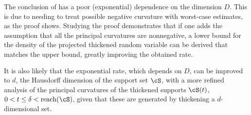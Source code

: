 \documentclass[../../book-main.tex]{subfiles}
\begin{document}
\begin{remark}
    The conclusion of  has
    a poor (exponential) dependence on the dimension $D$. This is due to needing
    to treat possible negative curvature with worst-case estimates, as the proof
    shows. Studying the proof demonstrates that if one adds the assumption that
    all the principal curvatures are nonnegative, a lower bound for the density
    of the projected thickened random variable can be derived that matches the
    upper bound, greatly improving the obtained rate.

    It is also likely that the exponential rate, which depends on $D$, can be
    improved to $d$, the Hausdorff dimension of the support set $\cS$, with
    a more refined analysis of the principal curvatures of the thickened
    supports $\cS(t)$, $0 < t \leq \delta < \mathrm{reach}(\cS)$, given that
    these are generated by thickening a $d$-dimensional set.
\end{remark}
\end{document}
